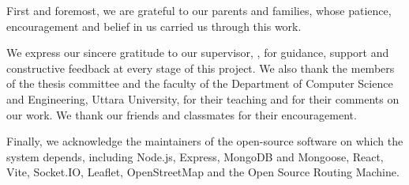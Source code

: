 First and foremost, we are grateful to our parents and families, whose patience, encouragement and belief in us carried us through this work.

We express our sincere gratitude to our supervisor, \supervisor, for guidance, support and constructive feedback at every stage of this project. We also thank the members of the thesis committee and the faculty of the Department of Computer Science and Engineering, Uttara University, for their teaching and for their comments on our work. We thank our friends and classmates for their encouragement.

Finally, we acknowledge the maintainers of the open-source software on which the system depends, including Node.js, Express, MongoDB and Mongoose, React, Vite, Socket.IO, Leaflet, OpenStreetMap and the Open Source Routing Machine.
